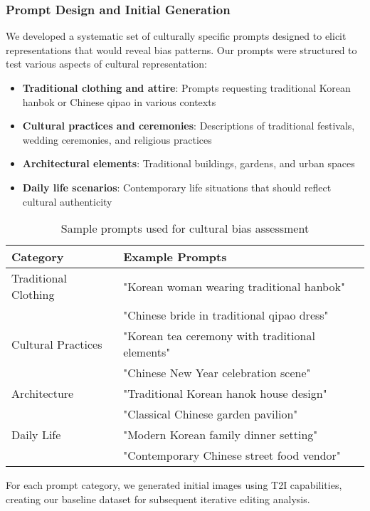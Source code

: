 \documentclass{article}
\begin{document}
\subsubsection{Prompt Design and Initial Generation}
We developed a systematic set of culturally specific prompts designed to elicit representations that would reveal bias patterns. Our prompts were structured to test various aspects of cultural representation:

\begin{itemize}
\item \textbf{Traditional clothing and attire}: Prompts requesting traditional Korean hanbok or Chinese qipao in various contexts
\item \textbf{Cultural practices and ceremonies}: Descriptions of traditional festivals, wedding ceremonies, and religious practices
\item \textbf{Architectural elements}: Traditional buildings, gardens, and urban spaces
\item \textbf{Daily life scenarios}: Contemporary life situations that should reflect cultural authenticity
\end{itemize}

\begin{table}[h]
  \caption{Sample prompts used for cultural bias assessment}
  \label{table:sample-prompts}
  \centering
  \begin{tabular}{ll}
    \toprule
    Category & Example Prompts \\
    \midrule
    Traditional Clothing & "Korean woman wearing traditional hanbok" \\
                         & "Chinese bride in traditional qipao dress" \\
    Cultural Practices & "Korean tea ceremony with traditional elements" \\
                      & "Chinese New Year celebration scene" \\
    Architecture & "Traditional Korean hanok house design" \\
                & "Classical Chinese garden pavilion" \\
    Daily Life & "Modern Korean family dinner setting" \\
              & "Contemporary Chinese street food vendor" \\
    \bottomrule
  \end{tabular}
\end{table}

For each prompt category, we generated initial images using T2I capabilities, creating our baseline dataset for subsequent iterative editing analysis.
\end{document}
